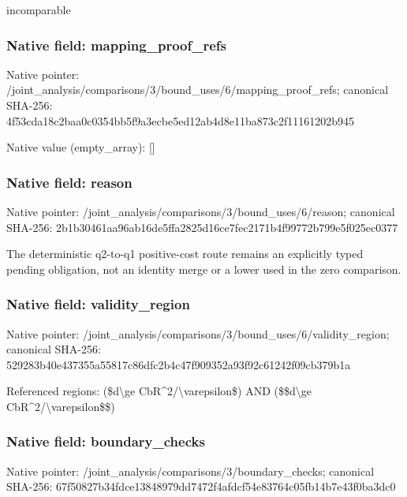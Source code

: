 \documentclass[10pt,a4paper]{article}
\begin{document}
\begingroup\raggedright\sloppy incomparable\par\endgroup

\subsubsection{Native field: mapping\_\allowbreak{}proof\_\allowbreak{}refs}
Native pointer: /joint\_\allowbreak{}analysis/comparisons/3/bound\_\allowbreak{}uses/6/mapping\_\allowbreak{}proof\_\allowbreak{}refs; canonical SHA-256: 4f53cda18c2baa0c0354bb5f9a3ecbe5ed12ab4d8e11ba873c2f11161202b945

Native value (empty\_\allowbreak{}array): []

\subsubsection{Native field: reason}
Native pointer: /joint\_\allowbreak{}analysis/comparisons/3/bound\_\allowbreak{}uses/6/reason; canonical SHA-256: 2b1b30461aa96ab16de5ffa2825d16ce7fec2171b4f99772b799e5f025ec0377

\begingroup\raggedright\sloppy The deterministic q2-to-q1 positive-cost route remains an explicitly typed pending obligation,\allowbreak{} not an identity merge or a lower used in the zero comparison.\par\endgroup

\subsubsection{Native field: validity\_\allowbreak{}region}
Native pointer: /joint\_\allowbreak{}analysis/comparisons/3/bound\_\allowbreak{}uses/6/validity\_\allowbreak{}region; canonical SHA-256: 529283b40e437355a55817c86dfc2b4c47f909352a93f92c61242f09cb379b1a

\begingroup\raggedright\sloppy Referenced regions:\allowbreak{} (\$d\textbackslash{}ge CbR\textasciicircum{}2/\allowbreak{}\textbackslash{}varepsilon\$) AND (\$\$d\textbackslash{}ge CbR\textasciicircum{}2/\allowbreak{}\textbackslash{}varepsilon\$\$)\par\endgroup

\subsubsection{Native field: boundary\_\allowbreak{}checks}
Native pointer: /joint\_\allowbreak{}analysis/comparisons/3/boundary\_\allowbreak{}checks; canonical SHA-256: 67f50827b34fdce13848979dd7472f4afdcf54e83764c05fb14b7e43f0ba3dc0
\end{document}
